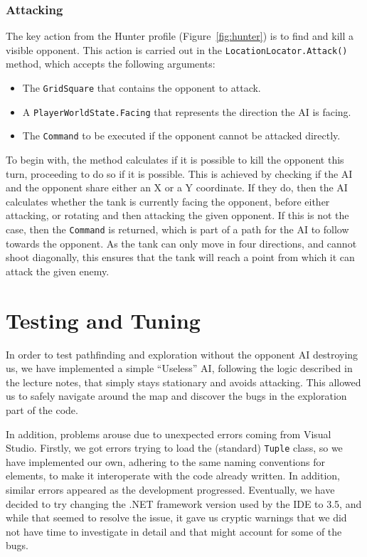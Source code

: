 \documentclass[11pt]{article}
\begin{document}
\subsubsection{Attacking}

The key action from the Hunter profile (Figure~\ref{fig:hunter}) is to find and kill a visible opponent. This action is carried out in the \verb|LocationLocator.Attack()| method, which accepts the following arguments:
\begin{itemize}
\item The \verb|GridSquare| that contains the opponent to attack.
\item A \verb|PlayerWorldState.Facing| that represents the direction the AI is facing.
\item The \verb|Command| to be executed if the opponent cannot be attacked directly.
\end{itemize}

To begin with, the method calculates if it is possible to kill the opponent this turn, proceeding to do so if it is possible. This is achieved by checking if the AI and the opponent share either an X or a Y coordinate. If they do, then the AI calculates whether the tank is currently facing the opponent, before either attacking, or rotating and then attacking the given opponent. If this is not the case, then the \verb|Command| is returned, which is part of a path for the AI to follow towards the opponent. As the tank can only move in four directions, and cannot shoot diagonally, this ensures that the tank will reach a point from which it can attack the given enemy.

\section{Testing and Tuning} \label{sec:testing}

In order to test pathfinding and exploration without the opponent AI destroying us, we have implemented a simple ``Useless'' AI, following the logic described in the lecture notes, that simply stays stationary and avoids attacking. This allowed us to safely navigate around the map and discover the bugs in the exploration part of the code.

In addition, problems arouse due to unexpected errors coming from Visual Studio. Firstly, we got errors trying to load the (standard) \verb|Tuple| class, so we have implemented our own, adhering to the same naming conventions for elements\cite{cSharpTuple}, to make it interoperate with the code already written. In addition, similar errors appeared as the development progressed. Eventually, we have decided to try changing the .NET framework version used by the IDE to 3.5, and while that seemed to resolve the issue, it gave us cryptic warnings that we did not have time to investigate in detail and that might account for some of the bugs.
\end{document}
